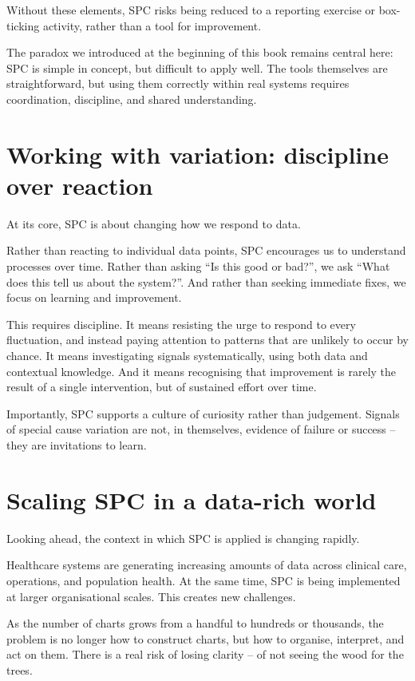 \documentclass[
]{book}
\begin{document}
Without these elements, SPC risks being reduced to a reporting exercise
or box-ticking activity, rather than a tool for improvement.

The paradox we introduced at the beginning of this book remains central
here: SPC is simple in concept, but difficult to apply well. The tools
themselves are straightforward, but using them correctly within real
systems requires coordination, discipline, and shared understanding.

\section{Working with variation: discipline over
reaction}\label{working-with-variation-discipline-over-reaction}

At its core, SPC is about changing how we respond to data.

Rather than reacting to individual data points, SPC encourages us to
understand processes over time. Rather than asking ``Is this good or
bad?'', we ask ``What does this tell us about the system?''. And rather
than seeking immediate fixes, we focus on learning and improvement.

This requires discipline. It means resisting the urge to respond to
every fluctuation, and instead paying attention to patterns that are
unlikely to occur by chance. It means investigating signals
systematically, using both data and contextual knowledge. And it means
recognising that improvement is rarely the result of a single
intervention, but of sustained effort over time.

Importantly, SPC supports a culture of curiosity rather than judgement.
Signals of special cause variation are not, in themselves, evidence of
failure or success -- they are invitations to learn.

\section{Scaling SPC in a data-rich
world}\label{scaling-spc-in-a-data-rich-world}

Looking ahead, the context in which SPC is applied is changing rapidly.

Healthcare systems are generating increasing amounts of data across
clinical care, operations, and population health. At the same time, SPC
is being implemented at larger organisational scales. This creates new
challenges.

As the number of charts grows from a handful to hundreds or thousands,
the problem is no longer how to construct charts, but how to organise,
interpret, and act on them. There is a real risk of losing clarity -- of
not seeing the wood for the trees.
\end{document}
